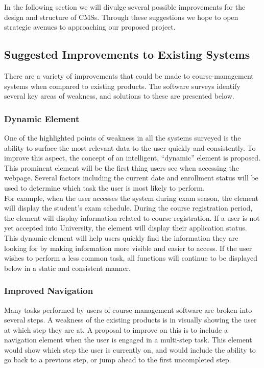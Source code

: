 \documentclass[10pt]{article}
\begin{document}
\begin{multicols}{2}
In the following section we will divulge several possible improvements for the 
design and structure of CMSs. Through these suggestions we hope to open strategic 
avenues to approaching our proposed project.\\
\subsection*{Suggested Improvements to Existing Systems}
There are a variety of improvements that could be made to course-management 
systems when compared to existing products. The software surveys identify 
several key areas of weakness, and solutions to these are presented below.\\

\subsubsection*{Dynamic Element}
One of the highlighted points of weakness in all the systems surveyed is the 
ability to surface the most relevant data to the user quickly and consistently. 
To improve this aspect, the concept of an intelligent, ``dynamic'' element is 
proposed. This prominent element will be the first thing users see when 
accessing the webpage. Several factors including the current date and enrollment 
status will be used to determine which task the user is most likely to perform.
\\

For example, when the user accesses the system during exam season, the element 
will display the student's exam schedule. During the course registration period, 
the element will display information related to course registration. If a user 
is not yet accepted into University, the element will display their application 
status.\\

This dynamic element will help users quickly find the information they are 
looking for by making information more visible and easier to access. If the user 
wishes to perform a less common task, all functions will continue to be 
displayed below in a static and consistent manner.\\

\subsubsection*{Improved Navigation}
Many tasks performed by users of course-management software are broken into 
several steps. A weakness of the existing products is in visually showing the 
user at which step they are at. A proposal to improve on this is to include a 
navigation element when the user is engaged in a multi-step task. This element 
would show which step the user is currently on, and would include the ability to 
go back to a previous step, or jump ahead to the first uncompleted step.\\


\end{multicols}
\end{document}
